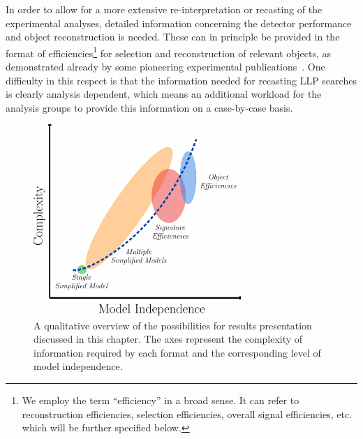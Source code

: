 In order to allow for a more extensive re-interpretation or recasting of
the experimental analyses, detailed information concerning the detector
performance and object reconstruction is needed.
These can in principle be provided in the format of efficiencies\footnote{We
employ the term ``efficiency'' in a broad sense. It can refer to reconstruction
efficiencies, selection efficiencies, overall signal efficiencies, etc. which will be further specified below.}
for selection and reconstruction of relevant objects, as demonstrated
already by some pioneering experimental publications~\cite{Khachatryan:2015lla,Aaboud:2017iio}.
One difficulty in this respect is that the information needed for recasting LLP searches is clearly
analysis dependent, which means an additional workload for the analysis groups to provide this information
on a case-by-case basis.

\begin{figure}[t]
\begin{center}
\includegraphics[width=0.7\textwidth,angle=0]{ch5-figures/LLP_interpretationsB.pdf}
\end{center}
\caption{A qualitative overview of the possibilities
for results presentation discussed in this chapter.
The axes represent the complexity of information required by each
format and the corresponding level of model independence.}
\label{fig:ch5-complexity-vs-modelindependence}
\end{figure}

